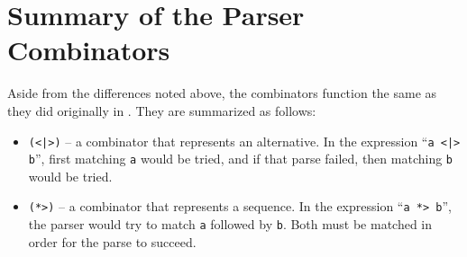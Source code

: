 \documentclass[../main.tex]{subfiles}
\begin{document}
\section{Summary of the Parser Combinators}

Aside from the differences noted above, the combinators function the same as they did originally in \cite{frosthafiz2008}.  They are summarized as follows:

\begin{itemize}
	\item \texttt{(<|>)} -- a combinator that represents an alternative.  In the expression ``\texttt{a <|> b}'', first matching \texttt{a} would be tried, and if that parse failed, then matching \texttt{b} would be tried.
	\item \texttt{(*>)} -- a combinator that represents a sequence.  In the expression ``\texttt{a *> b}'', the parser would try to match \texttt{a} followed by \texttt{b}.  Both must be matched in order for the parse to succeed.
\end{itemize}
\end{document}
